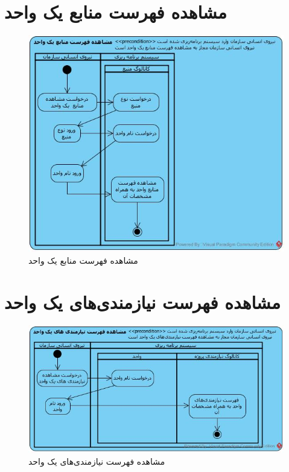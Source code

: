 \section{مشاهده فهرست منابع یک واحد}
\begin{figure}[H]
	\centering
	\includegraphics[scale=0.8]{img/activity/ViewListOfResources}
	\caption{مشاهده فهرست منابع یک واحد}
\end{figure}

\section{مشاهده فهرست نیازمندی‌های یک واحد}
\begin{figure}[H]
	\centering
	\includegraphics[scale=0.7]{img/activity/ViewListOfRequirements}
	\caption{مشاهده فهرست نیازمندی‌های یک واحد}
\end{figure}


